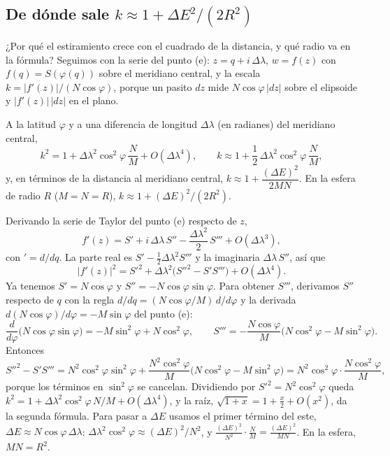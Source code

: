 \subsection{De dónde sale \texorpdfstring{\(k\approx1+\Delta E^2/(2R^2)\)}{k = 1 + ΔE²/(2R²)}}\label{sec:conformes-escala-serie}

¿Por qué el estiramiento crece con el cuadrado de la distancia, y qué radio va en la
fórmula? Seguimos con la serie del punto (e): \(z=q+i\,\Delta\lambda\), \(w=f(z)\) con
\(f(q)=S(\varphi(q))\) sobre el meridiano central, y la escala
\(k=\lvert f'(z)\rvert/(N\cos\varphi)\), porque un pasito \(dz\) mide \(N\cos\varphi\,\lvert dz\rvert\)
sobre el elipsoide y \(\lvert f'(z)\rvert\,\lvert dz\rvert\) en el plano.

\begin{proposicion}\label{prop:conf-escala-serie}
A la latitud \(\varphi\) y a una diferencia de longitud \(\Delta\lambda\) (en radianes) del
meridiano central,
\[
  k^2=1+\Delta\lambda^2\cos^2\varphi\,\frac NM+O(\Delta\lambda^4),
  \qquad
  k\approx1+\frac12\,\Delta\lambda^2\cos^2\varphi\,\frac NM ,
\]
y, en términos de la distancia al meridiano central,
\(k\approx1+\dfrac{(\Delta E)^2}{2MN}\). En la esfera de radio \(R\) (\(M=N=R\)),
\(k\approx1+(\Delta E)^2/(2R^2)\).
\end{proposicion}

\begin{demostracion}
Derivando la serie de Taylor del punto (e) respecto de \(z\),
\[
  f'(z)=S'+i\,\Delta\lambda\,S''-\frac{\Delta\lambda^2}{2}\,S'''+O(\Delta\lambda^3),
\]
con \('=d/dq\). La parte real es \(S'-\tfrac12\Delta\lambda^2S'''\) y la imaginaria
\(\Delta\lambda\,S''\), así que
\[
  \lvert f'(z)\rvert^2=S'^2+\Delta\lambda^2\bigl(S''^2-S'S'''\bigr)+O(\Delta\lambda^4).
\]
Ya tenemos \(S'=N\cos\varphi\) y \(S''=-N\cos\varphi\sin\varphi\). Para obtener \(S'''\),
derivamos \(S''\) respecto de \(q\) con la regla
\(d/dq=(N\cos\varphi/M)\,d/d\varphi\) y la derivada
\(d(N\cos\varphi)/d\varphi=-M\sin\varphi\) del punto (e):
\[
  \frac{d}{d\varphi}\bigl(N\cos\varphi\sin\varphi\bigr)=-M\sin^2\varphi+N\cos^2\varphi,
  \qquad
  S'''=-\frac{N\cos\varphi}{M}\bigl(N\cos^2\varphi-M\sin^2\varphi\bigr).
\]
Entonces
\[
  S''^2-S'S'''=N^2\cos^2\varphi\sin^2\varphi
  +\frac{N^2\cos^2\varphi}{M}\bigl(N\cos^2\varphi-M\sin^2\varphi\bigr)
  =N^2\cos^2\varphi\cdot\frac{N\cos^2\varphi}{M},
\]
porque los términos en \(\sin^2\varphi\) se cancelan. Dividiendo por \(S'^2=N^2\cos^2\varphi\)
queda \(k^2=1+\Delta\lambda^2\cos^2\varphi\,N/M+O(\Delta\lambda^4)\), y la raíz,
\(\sqrt{1+x}=1+\tfrac x2+O(x^2)\), da la segunda fórmula. Para pasar a \(\Delta E\) usamos el
primer término del este, \(\Delta E\approx N\cos\varphi\,\Delta\lambda\): \(\Delta\lambda^2\cos^2\varphi\approx(\Delta E)^2/N^2\),
y \(\frac{(\Delta E)^2}{N^2}\cdot\frac NM=\frac{(\Delta E)^2}{MN}\). En la esfera, \(MN=R^2\).
\end{demostracion}

